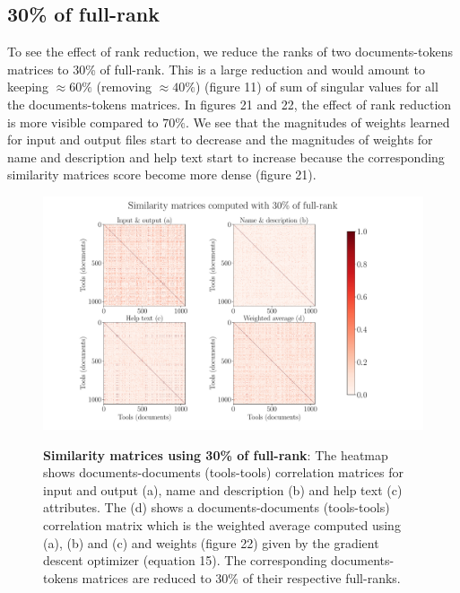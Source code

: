 \subsection{30\% of full-rank}
To see the effect of rank reduction, we reduce the ranks of two documents-tokens matrices to 30\% of full-rank. This is a large reduction and would amount to keeping $\approx 60\%$ (removing $\approx 40\%$) (figure 11) of sum of singular values for all the documents-tokens matrices. In figures 21 and 22, the effect of rank reduction is more visible compared to $70\%$. We see that the magnitudes of weights learned for input and output files start to decrease and the magnitudes of weights for name and description and help text start to increase because the corresponding similarity matrices score become more dense (figure 21). 

\begin{figure}[h]
\begin{centering}
    {\includegraphics[scale=0.35]{figures/Similarity_matrices_030.pdf}}
    \caption[Similarity matrices 30\% rank]{\textbf{Similarity matrices using 30\% of full-rank}: The heatmap shows documents-documents (tools-tools) correlation matrices for input and output (a), name and description (b) and help text (c) attributes. The (d) shows a documents-documents (tools-tools) correlation matrix which is the weighted average computed using (a), (b) and (c) and weights (figure 22) given by the gradient descent optimizer (equation 15). The corresponding documents-tokens matrices are reduced to 30\% of their respective full-ranks.}
\end{centering}
\end{figure}

